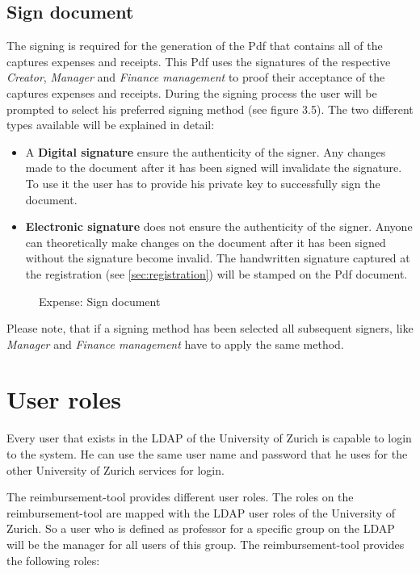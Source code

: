 \subsection{Sign document}
\label{sec:signing}
The signing is required for the generation of the Pdf that contains all of the captures expenses and receipts. This Pdf uses the signatures of the respective \textit{Creator}, \textit{Manager} and \textit{Finance management} to proof their acceptance of the captures expenses and receipts. During the signing process the user will be prompted to select his preferred signing method (see figure 3.5). The two different types available will be explained in detail:
\begin{itemize}
    \item A \textbf{Digital signature} ensure the authenticity of the signer. Any changes made to the document after it has been signed will invalidate the signature. To use it the user has to provide his private key to successfully sign the document.
    \item \textbf{Electronic signature} does not ensure the authenticity of the signer. Anyone can theoretically make changes on the document after it has been signed without the signature become invalid. The handwritten signature captured at the registration (see \ref{sec:registration}) will be stamped on the Pdf document.
\end{itemize}
    
\begin{figure}[H]
    \centering
    \caption{Expense: Sign document}
    \label{fig:expense-sign}
\end{figure}

Please note, that if a signing method has been selected all subsequent signers, like \textit{Manager} and \textit{Finance management} have to apply the same method.


\section{User roles}
\label{user-roles}

Every user that exists in the LDAP of the University of Zurich is capable to login to the system. He can use the same user name and password that he uses for the other University of Zurich services for login.

The reimbursement-tool provides different user roles. The roles on the reimbursement-tool are mapped with the LDAP user roles of the University of Zurich. So a user who is defined as professor for a specific group on the LDAP will be the manager for all users of this group. The reimbursement-tool provides the following roles:

